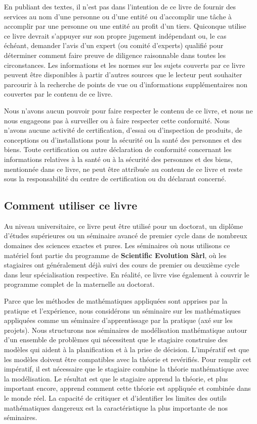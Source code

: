 	En publiant des textes, il n'est pas dans l'intention de ce livre de fournir des services au nom d'une personne ou d'une entité ou d'accomplir une tâche à accomplir par une personne ou une entité au profit d'un tiers. Quiconque utilise ce livre devrait s'appuyer sur son propre jugement indépendant ou, le cas échéant, demander l'avis d'un expert (ou comité d'experts) qualifié pour déterminer comment faire preuve de diligence raisonnable dans toutes les circonstances. Les informations et les normes sur les sujets couverts par ce livre peuvent être disponibles à partir d'autres sources que le lecteur peut souhaiter parcourir à la recherche de points de vue ou d'informations supplémentaires non couvertes par le contenu de ce livre.

	Nous n'avons aucun pouvoir pour faire respecter le contenu de ce livre, et nous ne nous engageons pas à surveiller ou à faire respecter cette conformité. Nous n'avons aucune activité de certification, d'essai ou d'inspection de produits, de conceptions ou d'installations pour la sécurité ou la santé des personnes et des biens. Toute certification ou autre déclaration de conformité concernant les informations relatives à la santé ou à la sécurité des personnes et des biens, mentionnée dans ce livre, ne peut être attribuée au contenu de ce livre et reste sous la responsabilité du centre de certification ou du déclarant concerné.

	\subsection{Comment utiliser ce livre}
	Au niveau universitaire, ce livre peut être utilisé pour un doctorat, un diplôme d'études supérieures ou un séminaire avancé de premier cycle dans de nombreux domaines des sciences exactes et pures. Les séminaires où nous utilisons ce matériel font partie du programme de \textbf{Scientific Evolution Sàrl}, où les stagiaires ont généralement déjà suivi des cours de premier ou deuxième cycle dans leur spécialisation respective. En réalité, ce livre vise également à couvrir le programme complet de la maternelle au doctorat.

	Parce que les méthodes de mathématiques appliquées sont apprises par la pratique et l'expérience, nous considérons un séminaire sur les mathématiques appliquées comme un séminaire d'apprentissage par la pratique (axé sur les projets). Nous structurons nos séminaires de modélisation mathématique autour d'un ensemble de problèmes qui nécessitent que le stagiaire construise des modèles qui aident à la planification et à la prise de décision. L'impératif est que les modèles doivent être compatibles avec la théorie et revérifiés. Pour remplir cet impératif, il est nécessaire que le stagiaire combine la théorie mathématique avec la modélisation. Le résultat est que le stagiaire apprend la théorie, et plus important encore, apprend comment cette théorie est appliquée et combinée dans le monde réel. La capacité de critiquer et d'identifier les limites des outils mathématiques dangereux est la caractéristique la plus importante de nos séminaires.

